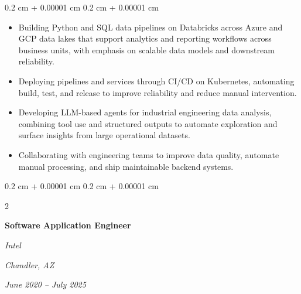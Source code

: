 \documentclass[10pt, letterpaper]{article}
\newenvironment{highlights}{
    \begin{itemize}[
        topsep=0.10 cm,
        parsep=0.10 cm,
        partopsep=0pt,
        itemsep=0pt,
        leftmargin=0.4 cm + 10pt
    ]
}{
    \end{itemize}
} %
\newenvironment{onecolentry}{
    \begin{adjustwidth}{
        0.2 cm + 0.00001 cm
    }{
        0.2 cm + 0.00001 cm
    }
}{
    \end{adjustwidth}
} %
\newenvironment{twocolentry}[2][]{
    \onecolentry
    \def\secondColumn{#2}
    \setcolumnwidth{\fill, 4.5 cm}
    \begin{paracol}{2}
}{
    \switchcolumn \raggedleft \secondColumn
    \end{paracol}
    \endonecolentry
} %
\begin{document}
        \vspace{0.10 cm}
        \begin{onecolentry}
            \begin{highlights}
                \item Building Python and SQL data pipelines on Databricks across Azure and GCP data lakes that support analytics and reporting workflows across business units, with emphasis on scalable data models and downstream reliability.
                \item Deploying pipelines and services through CI/CD on Kubernetes, automating build, test, and release to improve reliability and reduce manual intervention.
                \item Developing LLM-based agents for industrial engineering data analysis, combining tool use and structured outputs to automate exploration and surface insights from large operational datasets.
                \item Collaborating with engineering teams to improve data quality, automate manual processing, and ship maintainable backend systems.
            \end{highlights}
        \end{onecolentry}

        \vspace{0.2 cm}

        \begin{twocolentry}{
        \textit{Chandler, AZ}

        \textit{June 2020 -- July 2025}}
            \textbf{Software Application Engineer}

            \textit{Intel}
        \end{twocolentry}
\end{document}
